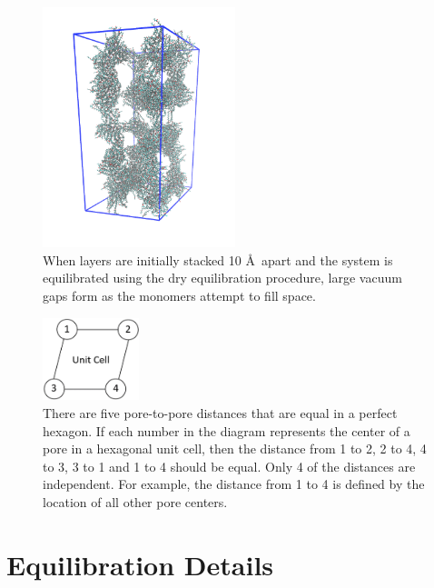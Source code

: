 \documentclass[journal=jpcbfk,manusciprt=article]{achemso}
\begin{document}
	  \begin{figure}[!htb]
		\centering
		\includegraphics[width=0.5\textwidth]{dbwl_10.png}
		\caption{When layers are initially stacked 10 \AA~apart and the system
                is equilibrated using the dry equilibration procedure, large vacuum gaps
		form as the monomers attempt to fill space.}\label{fig:dbwl_10} 
	  \end{figure}



  \begin{figure}[!htb]
	\centering
	\includegraphics[width=0.25\textwidth]{p2p_diagram.png}
	\caption{There are five pore-to-pore distances that are equal in a perfect
		hexagon. If each number in the diagram represents the center of a
		pore in a hexagonal unit cell, then the distance from 1 to 2, 2 to 4, 
		4 to 3, 3 to 1 and 1 to 4 should be equal. Only 4 of the distances
		are independent. For example, the distance from 1 to 4 is defined by
		the location of all other pore centers.}
	\label{fig:p2p_diagram}
  \end{figure}

  \section{Equilibration Details}\label{section:equilibration}
  
\end{document}
